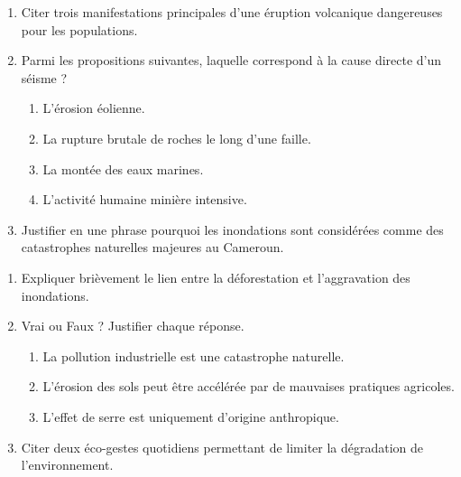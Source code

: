 \documentclass[11pt]{article}
\begin{document}
\begin{exercice}
\begin{enumerate}
    \item Citer trois manifestations principales d'une éruption volcanique dangereuses pour les populations.
    \item Parmi les propositions suivantes, laquelle correspond à la cause directe d'un séisme ?
    \begin{enumerate}
        \item L'érosion éolienne.
        \item La rupture brutale de roches le long d'une faille.
        \item La montée des eaux marines.
        \item L'activité humaine minière intensive.
    \end{enumerate}
    \item Justifier en une phrase pourquoi les inondations sont considérées comme des catastrophes naturelles majeures au Cameroun.
\end{enumerate}
\end{exercice}

\begin{exercice}
\begin{enumerate}
    \item Expliquer brièvement le lien entre la déforestation et l'aggravation des inondations.
    \item Vrai ou Faux ? Justifier chaque réponse.
    \begin{enumerate}
        \item La pollution industrielle est une catastrophe naturelle.
        \item L'érosion des sols peut être accélérée par de mauvaises pratiques agricoles.
        \item L'effet de serre est uniquement d'origine anthropique.
    \end{enumerate}
    \item Citer deux éco-gestes quotidiens permettant de limiter la dégradation de l'environnement.
\end{enumerate}
\end{exercice}
\end{document}
